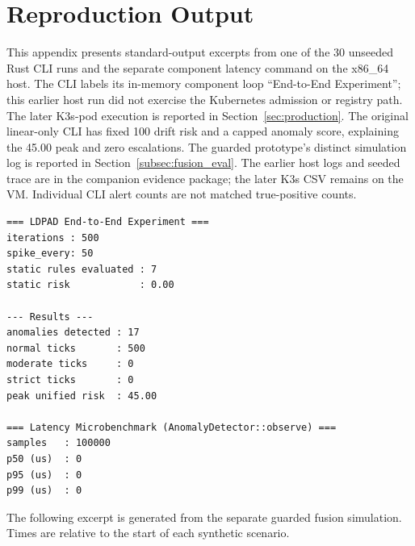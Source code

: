 \documentclass{ieeeaccess}
\begin{document}


\section{Reproduction Output}
\label{app:reproduce}

This appendix presents standard-output excerpts from one of the 30 unseeded Rust CLI runs and the separate component latency command on the x86\_64 host. The CLI labels its in-memory component loop ``End-to-End Experiment''; this earlier host run did not exercise the Kubernetes admission or registry path. The later K3s-pod execution is reported in Section~\ref{sec:production}. The original linear-only CLI has fixed 100 drift risk and a capped anomaly score, explaining the 45.00 peak and zero escalations. The guarded prototype's distinct simulation log is reported in Section~\ref{subsec:fusion_eval}. The earlier host logs and seeded trace are in the companion evidence package; the later K3s CSV remains on the VM. Individual CLI alert counts are not matched true-positive counts.

\begingroup
\scriptsize
\begin{verbatim}
=== LDPAD End-to-End Experiment ===
iterations : 500
spike_every: 50
static rules evaluated : 7
static risk            : 0.00

--- Results ---
anomalies detected : 17
normal ticks       : 500
moderate ticks     : 0
strict ticks       : 0
peak unified risk  : 45.00

=== Latency Microbenchmark (AnomalyDetector::observe) ===
samples   : 100000
p50 (us)  : 0
p95 (us)  : 0
p99 (us)  : 0
\end{verbatim}
\endgroup

The following excerpt is generated from the separate guarded fusion simulation. Times are relative to the start of each synthetic scenario.

\begingroup
\scriptsize

\endgroup
\end{document}
